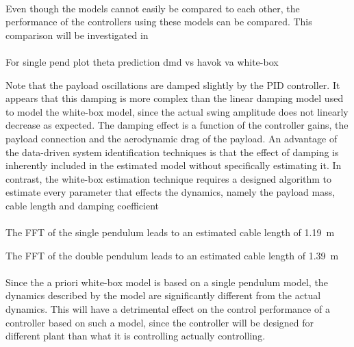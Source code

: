         \paragraph{}
        Even though the models cannot easily be compared to each other, 
        the performance of the controllers using these models can be compared.
        This comparison will be investigated in %

        \paragraph{}
        For single pend
        plot theta prediction dmd vs havok va white-box

        Note that the payload oscillations are damped slightly by the PID controller.
        It appears that this damping is more complex than the linear damping model 
        used to model the white-box model, since the actual swing amplitude 
        does not linearly decrease as expected.
        The damping effect is a function of the controller gains, 
        the payload connection and the aerodynamic drag of the payload.
        An advantage of the data-driven system identification techniques 
        is that the effect of damping is inherently included in the estimated model 
        without specifically estimating it.
        In contrast, the white-box estimation technique requires a designed algorithm 
        to estimate every parameter that effects the dynamics, 
        namely the payload mass, cable length and damping coefficient


        \paragraph{}
        
        
        
        
        
        
        
        The FFT of the single pendulum leads to an estimated cable length of \SI{1.19}{\metre}        

        
        The FFT of the double pendulum leads to an estimated cable length of \SI{1.39}{\metre}
        
        \paragraph{}
        Since the a priori white-box model is based on a single pendulum model, 
        the dynamics described by the model are significantly different from the actual dynamics.
        This will have a detrimental effect on the control performance of a controller based on such a model,
        since the controller will be designed for different plant than what it is controlling actually controlling.
        
